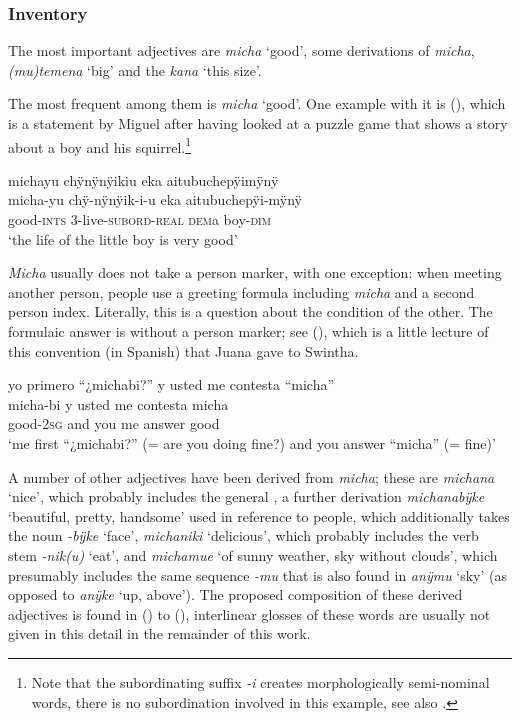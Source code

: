 \subsubsection{Inventory}\label{sec:ADJInventory}

The most important adjectives are \textit{micha} ‘good’, some derivations of \textit{micha}, \textit{(mu)te\-mena} ‘big’ and the  \textit{kana} ‘this size’.

The most frequent among them is \textit{micha} ‘good’. One example with it is (), which is a statement by Miguel after having looked at a puzzle game that shows a story about a boy and his squirrel.\footnote{Note that the subordinating suffix \textit{-i} creates morphologically semi-nominal words, there is no subordination involved in this example, see also .}

\ea\label{ex:micha-1}
\begingl
\glpreamble michayu chÿnÿnÿikiu eka aitubuchepÿimÿnÿ\\
\gla micha-yu chÿ-nÿnÿik-i-u eka aitubuchepÿi-mÿnÿ\\
\glb good-\textsc{ints} 3-live-\textsc{subord}-\textsc{real} \textsc{dem}a boy-\textsc{dim}\\
\glft ‘the life of the little boy is very good’
\endgl
\trailingcitation{[mdx-c120416ls.191]}
\xe

\textit{Micha} usually does not take a person marker, with one exception: when meeting another person, people use a greeting formula including \textit{micha} and a second person index. Literally, this is a question about the condition of the other. The formulaic answer is without a person marker; see (), which is a little lecture of this convention (in Spanish) that Juana gave to Swintha.

\ea\label{ex:ADJ-micha-1}
\begingl
\glpreamble yo primero “¿michabi?” y usted me contesta “micha”\\
 micha-bi {y usted me contesta} micha\\
 good-2\textsc{sg} {and you me answer} good\\
\glft ‘me first “¿michabi?” (= are you doing fine?) and you answer “micha” (= fine)’
\endgl
\trailingcitation{[jxx-n101013s-1.080-083]}
\xe
{}

A number of other adjectives have been derived from \textit{micha}; these are \textit{michana} ‘nice’, which probably includes the general , a further derivation \textit{michanabÿke} ‘beautiful, pretty, handsome’ used in reference to people, which additionally takes the noun \textit{-bÿke} ‘face’, \textit{michaniki} ‘delicious’, which probably includes the verb stem \textit{-nik(u)} ‘eat’, and \textit{michamue} ‘of sunny weather, sky without clouds’, which presumably includes the same sequence \textit{-mu} that is also found in \textit{anÿmu} ‘sky’ (as opposed to \textit{anÿke} ‘up, above’). The proposed composition of these derived adjectives is found in () to (), interlinear glosses of these words are usually not given in this detail in the remainder of this work.


